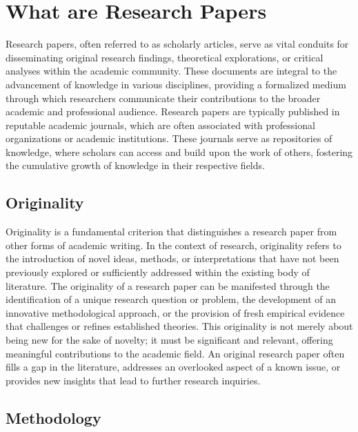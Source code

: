 \documentclass[
]{book}
\begin{document}
\section{What are Research Papers}\label{what-are-research-papers}

Research papers, often referred to as scholarly articles, serve as vital conduits for disseminating original research findings, theoretical explorations, or critical analyses within the academic community. These documents are integral to the advancement of knowledge in various disciplines, providing a formalized medium through which researchers communicate their contributions to the broader academic and professional audience. Research papers are typically published in reputable academic journals, which are often associated with professional organizations or academic institutions. These journals serve as repositories of knowledge, where scholars can access and build upon the work of others, fostering the cumulative growth of knowledge in their respective fields.

\subsection*{Originality}\label{originality}

Originality is a fundamental criterion that distinguishes a research paper from other forms of academic writing. In the context of research, originality refers to the introduction of novel ideas, methods, or interpretations that have not been previously explored or sufficiently addressed within the existing body of literature. The originality of a research paper can be manifested through the identification of a unique research question or problem, the development of an innovative methodological approach, or the provision of fresh empirical evidence that challenges or refines established theories. This originality is not merely about being new for the sake of novelty; it must be significant and relevant, offering meaningful contributions to the academic field. An original research paper often fills a gap in the literature, addresses an overlooked aspect of a known issue, or provides new insights that lead to further research inquiries.

\subsection*{Methodology}\label{methodology}
\end{document}
